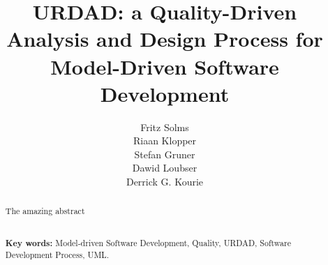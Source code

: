 \documentclass{llncs}
\begin{document}
\title{URDAD: a Quality-Driven Analysis and Design Process
       for Model-Driven Software Development}
\author{ Fritz Solms \\
			Riaan Klopper \\
		   Stefan Gruner \\
 			Dawid Loubser \\
         Derrick G. Kourie }
\maketitle

\begin{abstract}
The amazing abstract

\\[0.1cm]\textbf{Key words:}
Model-driven Software Development, Quality, URDAD,
Software Development Process, UML.
\end{abstract}

















\end{document}
